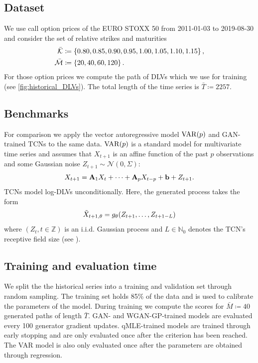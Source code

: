 \documentclass[]{article} %
\begin{document}
\subsection{Dataset}
We use call option prices of the EURO STOXX 50 from 2011-01-03 to 2019-08-30 and consider the set of relative strikes and maturities
\begin{align*}
\bar{\mathcal{K}} &\coloneqq \left\lbrace 0.80, 0.85, 0.90, 0.95, 1.00, 1.05, 1.10, 1.15\right\rbrace,\\
\bar{\mathcal{M}} &\coloneqq \left\lbrace 20, 40, 60, 120 \right\rbrace.
\end{align*}
For those option prices we compute the path of DLVs which we use for training (see \autoref{fig:historical_DLVs}). The total length of the time series is $\bar T\coloneqq 2257$. 
\subsection{Benchmarks}
For comparison we apply the vector autoregressive model $\operatorname{VAR}(p)$ \cite{Johansen1995} and GAN-trained TCNs \cite{Wiese2019} to the same data. $\operatorname{VAR}(p)$ is a standard model for multivariate time series and assumes that $X_{t+1}$ is an affine function of the past $p$ observations and some Gaussian noise $Z_{t+1}\sim\mathcal{N}(0, \Sigma)$:
\[
X_{t+1} = \mathbf{A}_1 X_{t} + \dots + \mathbf{A}_p X_{t-p} + \mathbf{b} + Z_{t+1}.
\]
TCNs model log-DLVs unconditionally. Here, the generated process takes the form
\[
\tilde {X}_{t+1, \theta} = g_\theta(Z_{t+1}, \dots, Z_{t+1-L})
\]
where $(Z_t, t\in\mathbb{Z})$ is an i.i.d. Gaussian process and $L\in\mathbb{N}_0$ denotes the TCN's receptive field size (see \cite{Wiese2019}). 

\subsection{Training and evaluation time}
We split the the historical series into a training and validation set through random sampling. The training set holds 85\% of the data and is used to calibrate the parameters of the model. During training we compute the scores for $\bar M\coloneqq40$ generated paths of length $\bar T$. GAN- and WGAN-GP-trained models are evaluated every 100 generator gradient updates. qMLE-trained models are trained through early stopping and are only evaluated once after the criterion has been reached. The VAR model is also only evaluated once after the parameters are obtained through regression. 
\end{document}
